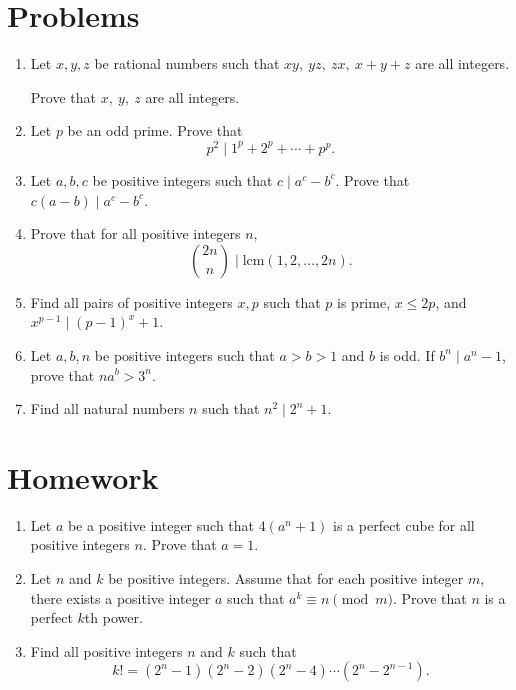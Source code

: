 \documentclass{article}
\newcommand\lcm{\mathrm{lcm}}
\begin{document}
\section{Problems}
\begin{enumerate}
  \item Let $x,y,z$ be rational numbers such that $xy,\ yz,\ zx,\ x+y+z$ are all
    integers.

    Prove that $x,\ y,\ z$ are all integers.
  \item Let $p$ be an odd prime. Prove that
    \[p^2\mid 1^p+2^p+\cdots+p^p.\]
  \item Let $a,b,c$ be positive integers such that $c\mid a^c-b^c$. Prove that
    $c(a-b)\mid a^c-b^c$.
  \item Prove that for all positive integers $n$,
    \[\binom{2n}n\mid\lcm(1,2,\ldots,2n).\]
  \item Find all pairs of positive integers $x,p$ such that $p$ is prime, $x\le
    2p$, and $x^{p-1}\mid (p-1)^x+1$.
  \item Let $a,b,n$ be positive integers such that $a>b>1$ and $b$ is odd. If
    $b^n\mid a^n-1$, prove that $na^b>3^n$.
  \item Find all natural numbers $n$ such that $n^2\mid 2^n+1$.
\end{enumerate}
\newpage
\section{Homework}
  \begin{enumerate}
    \item Let $a$ be a positive integer such that $4(a^n+1)$ is a perfect
      cube for all positive integers $n$. Prove that $a=1$.
    \item Let $n$ and $k$ be positive integers. Assume that for each positive
      integer $m$, there exists a positive integer $a$ such that $a^k\equiv
      n\pmod m$. Prove that $n$ is a perfect $k$th power.
    \item Find all positive integers $n$ and $k$ such that
      \[k!=(2^n-1)(2^n-2)(2^n-4)\cdots(2^n-2^{n-1}).\]
  \end{enumerate}
\end{document}
